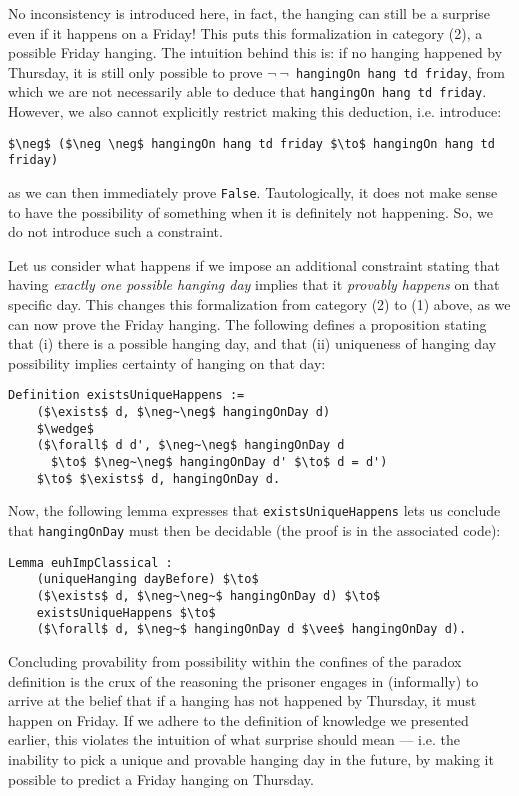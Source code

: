 \documentclass[runningheads]{llncs}
\begin{document}
No inconsistency is introduced here, in fact, the hanging can still be a surprise even if it
happens on a Friday! This puts this formalization in category (2), a possible Friday hanging.
The intuition behind this is: if no hanging happened by
Thursday, it is still only possible to prove {\tt $\neg~\neg$~hangingOn hang td friday},
from which we are not necessarily able to deduce that {\tt hangingOn hang td friday}.
However, we also cannot explicitly restrict making this deduction, i.e. introduce:

\begin{lstlisting}[mathescape=true]
    $\neg$ ($\neg \neg$ hangingOn hang td friday $\to$ hangingOn hang td friday)
\end{lstlisting}

as we can then immediately prove {\tt False}. Tautologically, it does not make sense to have the possibility
of something when it is definitely not happening. So, we do not introduce
such a constraint.

Let us consider what happens if we impose an additional constraint stating that having
\emph{exactly one possible hanging day}
implies that it \emph{provably happens} on that specific day. This changes this
formalization from category (2) to (1) above, as we can now prove the Friday
hanging. The following defines a
proposition stating that (i) there is a possible hanging day, and that (ii) uniqueness of hanging day
possibility implies certainty of hanging on that day:

\begin{lstlisting}[mathescape=true]
  Definition existsUniqueHappens :=
    ($\exists$ d, $\neg~\neg$ hangingOnDay d)
    $\wedge$
    ($\forall$ d d', $\neg~\neg$ hangingOnDay d
      $\to$ $\neg~\neg$ hangingOnDay d' $\to$ d = d')
    $\to$ $\exists$ d, hangingOnDay d.
\end{lstlisting}

Now, the following lemma expresses that {\tt existsUniqueHappens} lets us
conclude that {\tt hangingOnDay} must then be decidable (the proof is in the
associated code):

\begin{lstlisting}[mathescape=true]
  Lemma euhImpClassical :
    (uniqueHanging dayBefore) $\to$
    ($\exists$ d, $\neg~\neg~$ hangingOnDay d) $\to$
    existsUniqueHappens $\to$
    ($\forall$ d, $\neg~$ hangingOnDay d $\vee$ hangingOnDay d).
\end{lstlisting}

Concluding provability from possibility within the confines of the paradox definition
is the crux of the reasoning the prisoner
engages in (informally) to arrive at the belief that
if a hanging has not happened by Thursday, it must happen on Friday.
If we adhere to the definition of knowledge we presented earlier, this violates
the intuition of what surprise should mean --- i.e. the inability
to pick a unique and provable hanging day in the future, by making it possible
to predict a Friday hanging on Thursday.
\end{document}
